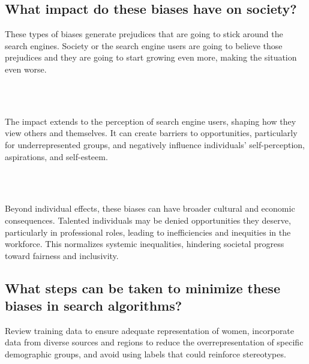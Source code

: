 \documentclass[twoside]{article}
\begin{document}
\subsection*{What impact do these biases have on society?}
\begin{justifying}
These types of biases generate prejudices that are going to stick around the search engines. Society or the search engine users are going to believe those prejudices and they are going to start growing even more, making the situation even worse.
\end{justifying}
\\
\\
\begin{justifying}
The impact extends to the perception of search engine users, shaping how they view others and themselves. It can create barriers to opportunities, particularly for underrepresented groups, and negatively influence individuals' self-perception, aspirations, and self-esteem.
\end{justifying}
\\
\\
\begin{justifying}
Beyond individual effects, these biases can have broader cultural and economic consequences. Talented individuals may be denied opportunities they deserve, particularly in professional roles, leading to inefficiencies and inequities in the workforce. This normalizes systemic inequalities, hindering societal progress toward fairness and inclusivity.
\end{justifying}



\subsection*{What steps can be taken to minimize these biases in search algorithms?}
\begin{justifying}
	Review training data to ensure adequate representation of women, incorporate data from diverse sources and regions to reduce the overrepresentation of specific demographic groups, and avoid using labels that could reinforce stereotypes.
\end{justifying}
\end{document}

